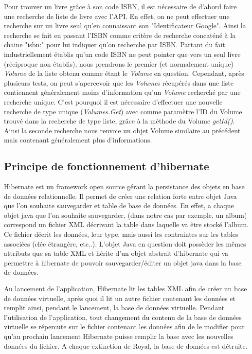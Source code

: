 Pour trouver un livre grâce à son code ISBN, il est nécessaire de d'abord faire une recherche de liste de livre avec l'API. En effet, on ne peut effectuer une recherche sur un livre seul qu'en connaissant son "Identificateur Google". Ainsi la recherche se fait en passant l'ISBN comme critère de recherche concaténé à la chaine "isbn:" pour lui indiquer qu'on recherche par ISBN. Partant du fait industriellement établis qu'un code ISBN ne peut pointer que vers un seul livre (réciproque non établis), nous prendrons le premier (et normalement unique) \emph{Volume} de la liste obtenu comme étant le \emph{Volume} en question. Cependant, après plusieurs tests, on peut s'apercevoir que les \emph{Volume}s récupérés dans une liste contiennent généralement moins d'information qu'un \emph{Volume} recherché par une recherche unique. C'est pourquoi il est nécessaire d'effectuer une nouvelle recherche de type unique (\emph{Volumes.Get}) avec comme paramètre l'ID du Volume trouvé dans la recherche de type liste, grâce à la méthode du Volume \emph{getId()}. Ainsi la seconde recherche nous renvoie un objet Volume similaire au précédent mais contenant généralement plus d'informations.


\subsection{Principe de fonctionnement d'hibernate}

Hibernate est un framework open source gérant la persistance des objets en base de données relationnelle.
Il permet de créer une relation forte entre objet Java que l'on souhaite sauvegarder et table de base de données. En effet, a chaque objet java que l'on souhaite sauvegarder, (dans notre cas par exemple, un album) correspond un fichier XML décrivant la table dans laquelle va être stocké l'album. Ce fichier décrit les données, leur type, mais aussi les contraintes sur les tables associées (clée étrangère, etc..).
L'objet Java en question doit possèder les mêmes attributs que sa table XML et hérite d'un objet abstrait d'hibernate qui va permettre à hibernate de pouvoir sauvegarder/éditer un objet java dans la base de données.

Au lancement de l'application, Hibernate lit les tables XML afin de créer un base de données virtuelle, après quoi il lit un autre fichier contenant les données et remplit ainsi, pendant le lancement, la base de données virtuelle. Pendant l'utilisation de l'application, tout changement du contenu de la base de données virtuelle se répercute sur le fichier contenant les données afin de le modifier pour qu'au prochain lancement Hibernate puisse remplir la base avec les nouvelles données du fichier. A chaque extinction de Royal, la base de données est détruite.

